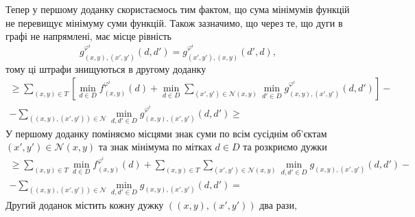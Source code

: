 Тепер у першому доданку скористаємось тим фактом,
що сума мінімумів функцій не перевищує мінімуму суми функцій.
Також зазначимо, що через те, що дуги в графі не напрямлені,
має місце рівність
\begin{equation*}
    g_{\left(x, y \right), \left(x', y' \right)}^{\varphi^i}
            \left(d, d' \right) =
    g_{\left(x', y' \right), \left(x, y \right)}^{\varphi^i}
            \left(d', d \right),
\end{equation*}
тому ці штрафи знищуються в другому доданку
\begin{equation*}
\begin{gathered}
    \ge \sum \limits_{\left(x, y \right) \in T} \left[
        \min \limits_{d \in D}
            f_{\left(x, y \right)}^{\varphi^i} \left(d \right) +
        \min \limits_{d \in D}
            \sum \limits_{\left(x', y' \right) \in \mathcal{N} \left(x, y \right)}
                \min \limits_{d' \in D}
                    g_{\left(x, y \right), \left(x', y' \right)}^{\varphi^i}
                        \left(d, d' \right)
    \right] - \\
    - \sum \limits_{\left(\left(x, y \right), \left(x', y' \right) \right) \in \mathcal{N}}
        \min \limits_{d, d' \in D}
            g_{\left(x, y \right), \left(x', y' \right)}^{\varphi^i}
                \left(d, d' \right) \ge
\end{gathered}
\end{equation*}
У першому доданку поміняємо місцями знак суми по всім сусіднім об'єктам
$\left(x', y' \right) \in \mathcal{N} \left(x, y \right)$
та знак мінімума по мітках $d \in D$ та розкриємо дужки
\begin{equation*}
\begin{gathered}
    \ge \sum \limits_{\left(x, y \right) \in T}
        \min \limits_{d \in D}
            f_{\left(x, y \right)}^{\varphi^i} \left( d \right) +
    \sum \limits_{\left(x, y \right) \in T}
        \sum \limits_{\left(x', y' \right) \in \mathcal{N} \left(x, y \right)}
            \min \limits_{d, d' \in D}
                g_{\left(x, y \right), \left(x', y' \right)}
                    \left( d, d' \right) - \\
    - \sum \limits_{\left(\left(x, y \right), \left(x', y' \right) \right) \in \mathcal{N}}
        \min \limits_{d, d' \in D}
            g_{\left(x, y \right), \left(x', y' \right)} \left( d, d' \right) =
\end{gathered}
\end{equation*}
Другий доданок містить кожну дужку
$\left( \left(x, y \right), \left(x', y' \right) \right)$ два рази,
